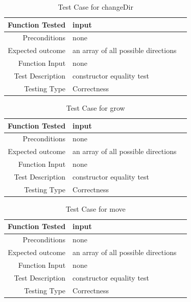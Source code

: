 \documentclass[12pt]{article}
\begin{document}
\begin{center}
	\begin{longtable}{ | r | p{4cm} | p{4cm} }
	\caption{Test Case for changeDir} \\ \hline \label{TblInputVar} 
	Function Tested & input\\ \hline
	Preconditions & none \\ \hline
	Expected outcome & an array of all possible directions \\ \hline
	Function Input & none \\ \hline
	Test Description & constructor equality test\\ \hline
	Testing Type & Correctness\\ \hline
	
	\end{longtable}
\end{center}

\begin{center}
	\begin{longtable}{ | r | p{4cm} | p{4cm} }
	\caption{Test Case for grow} \\ \hline \label{TblInputVar} 
	Function Tested & input\\ \hline
	Preconditions & none \\ \hline
	Expected outcome & an array of all possible directions \\ \hline
	Function Input & none \\ \hline
	Test Description & constructor equality test\\ \hline
	Testing Type & Correctness\\ \hline
	
	\end{longtable}
\end{center}

\begin{center}
	\begin{longtable}{ | r | p{4cm} | p{4cm} }
	\caption{Test Case for move} \\ \hline \label{TblInputVar} 
	Function Tested & input\\ \hline
	Preconditions & none \\ \hline
	Expected outcome & an array of all possible directions \\ \hline
	Function Input & none \\ \hline
	Test Description & constructor equality test\\ \hline
	Testing Type & Correctness\\ \hline
	
	\end{longtable}
\end{center}
\end{document}
